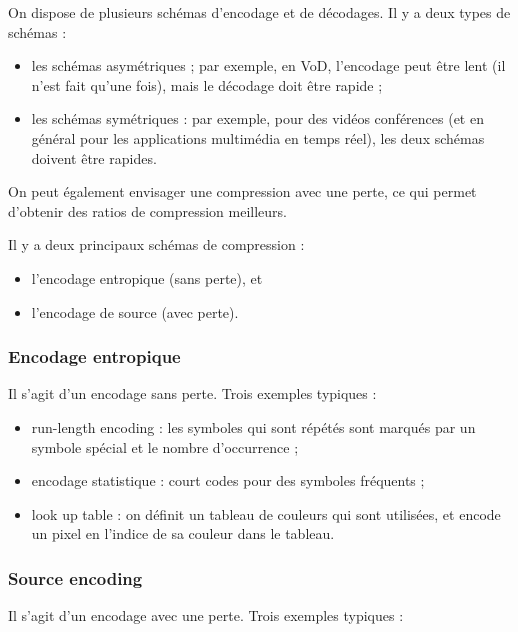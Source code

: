 		On dispose de plusieurs schémas d'encodage et de décodages. Il y a deux types de schémas :
		
		\begin{itemize}
			\item les schémas asymétriques ; par exemple, en VoD, l'encodage peut être lent (il n'est fait qu'une fois), mais le décodage doit être rapide ;
			\item les schémas symétriques : par exemple, pour des vidéos conférences (et en général pour les applications multimédia en temps réel), les deux schémas doivent être rapides.
		\end{itemize}
		
		On peut également envisager une compression avec une perte, ce qui permet d'obtenir des ratios de compression meilleurs.
		
		Il y a deux principaux schémas de compression :
		
		\begin{itemize}
			\item l'encodage entropique (sans perte), et
			\item l'encodage de source (avec perte).
		\end{itemize}
		
		\subsubsection{Encodage entropique}
		
		Il s'agit d'un encodage sans perte. Trois exemples typiques :
		
		\begin{itemize}
			\item run-length encoding : les symboles qui sont répétés sont marqués par un symbole spécial et le nombre d'occurrence ;
			\item encodage statistique : court codes pour des symboles fréquents ;
			\item look up table : on définit un tableau de couleurs qui sont utilisées, et encode un pixel en l'indice de sa couleur dans le tableau.
		\end{itemize}
		
		\subsubsection{Source encoding}
		
		Il s'agit d'un encodage avec une perte. Trois exemples typiques :
		
